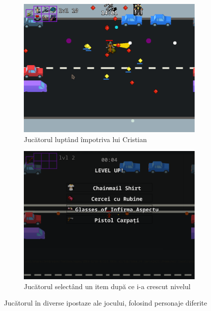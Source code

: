 \documentclass{article}
\begin{document}
\begin{figure}[H]
        \begin{subfigure}{0.45\textwidth}
            \includegraphics[width=\textwidth]{level3-end}
            \centering
            \caption{Jucătorul luptând împotriva lui Cristian}
        \end{subfigure}
        \hfill
        \begin{subfigure}{0.45\textwidth}
            \includegraphics[width=\textwidth]{levelup-menu}
            \centering
            \caption{Jucătorul selectând un item după ce i-a crescut nivelul}
        \end{subfigure}

        \caption{Jucătorul în diverse ipostaze ale jocului, folosind personaje diferite}
    \end{figure}
\end{document}

